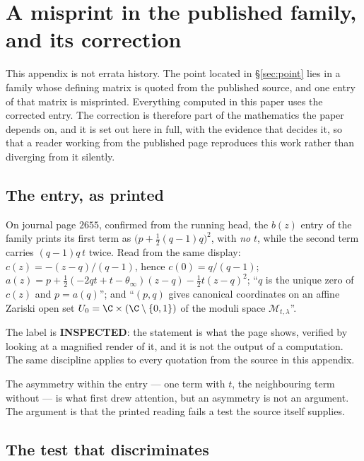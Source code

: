 \section{A misprint in the published family, and its correction}\label{app:typo}

This appendix is not errata history. The point located in \S\ref{sec:point}
lies in a family whose defining matrix is quoted from the published source, and
one entry of that matrix is misprinted. Everything computed in this paper uses
the corrected entry. The correction is therefore part of the mathematics the
paper depends on, and it is set out here in full, with the evidence that
decides it, so that a reader working from the published page reproduces this
work rather than diverging from it silently.

\subsection{The entry, as printed}\label{ssec:typo-printed}

\begin{remark}
On journal page $2655$, confirmed from the running head, the $b(z)$ entry of
the family prints its first term as
$\bigl(p+\tfrac12(q-1)q\bigr)^{2}$, with \emph{no} $t$, while the second term
carries $(q-1)q\,t$ twice. Read from the same display: $c(z)=-(z-q)/(q-1)$,
hence $c(0)=q/(q-1)$; $a(z)=p+\tfrac12(-2qt+t-\theta_\infty)(z-q)-\tfrac12
t(z-q)^{2}$; ``$q$ is the unique zero of $c(z)$ and $p=a(q)$''; and
``$(p,q)$ gives canonical coordinates on an affine Zariski open set
$U_0=\C\times(\C\setminus\{0,1\})$ of the moduli space $\mathcal M_{t,\lambda}$''.
\end{remark}

The label is \textbf{INSPECTED}: the statement is what the page shows, verified
by looking at a magnified render of it, and it is not the output of a
computation. The same discipline applies to every quotation from the source in
this appendix.

The asymmetry within the entry --- one term with $t$, the neighbouring term
without --- is what first drew attention, but an asymmetry is not an argument.
The argument is that the printed reading fails a test the source itself
supplies.

\subsection{The test that discriminates}\label{ssec:typo-test}

